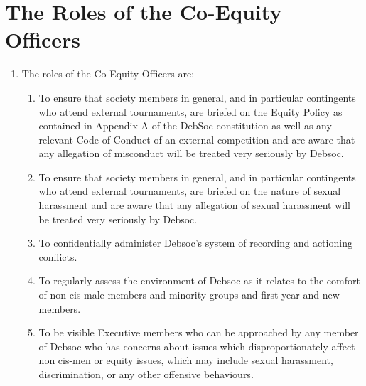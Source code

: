 \newpage
\section{The Roles of the Co-Equity Officers}

\begin{enumerate}
\item The roles of the Co-Equity Officers are:
  \begin{enumerate}
  \item To ensure that society members in general, and in particular contingents who attend external tournaments, are briefed on the Equity Policy as contained in Appendix A of the DebSoc constitution as well as any relevant Code of Conduct of an external competition and are aware that any allegation of misconduct will be treated very seriously by Debsoc.
  \item To ensure that society members in general, and in particular contingents who attend external tournaments, are briefed on the nature of sexual harassment and are aware that any allegation of sexual harassment will be treated very seriously by Debsoc.
  \item To confidentially administer Debsoc’s system of recording and actioning conflicts.
  \item To regularly assess the environment of Debsoc as it relates to the comfort of non cis-male members and minority groups and first year and new members.
  \item To be visible Executive members who can be approached by any member of Debsoc who has concerns about issues which disproportionately affect non cis-men or equity issues, which may include sexual harassment, discrimination, or any other offensive behaviours.
  \end{enumerate}
\end{enumerate}
